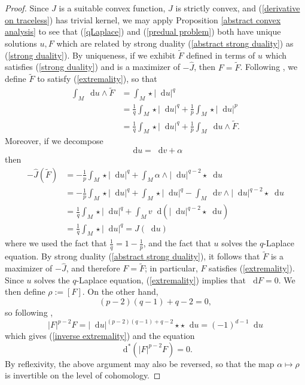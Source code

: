 \documentclass[reqno,11pt]{amsart}
\newcommand*\dif{\mathop{}\!\mathrm{d}}
\theoremstyle{definition}
\numberwithin{equation}{section}
\begin{document}
\begin{proof}
Since $J$ is a suitable convex function, $\hat J$ is strictly convex, and (\ref{derivative on traceless}) has trivial kernel, we may apply Proposition \ref{abstract convex analysis} to see that (\ref{qLaplace}) and (\ref{predual problem}) both have unique solutions $u, F$ which are related by strong duality (\ref{abstract strong duality}) as (\ref{strong duality}).
By uniqueness, if we exhibit $\tilde F$ defined in terms of $u$ which satisfies (\ref{strong duality}) and is a maximizer of $-\hat J$, then $F = \tilde F$.
Following \cite[Chapter IV, (2.12)]{Ekeland99}, we define $\tilde F$ to satisfy (\ref{extremality}), so that 
\begin{align*}
\int_M \dif u \wedge \tilde F 
&= \int_M \star |\dif u|^q \\
&= \frac{1}{q} \int_M \star |\dif u|^q + \frac{1}{p} \int_M \star |\dif u|^p \\
&= \frac{1}{q} \int_M \star |\dif u|^q + \frac{1}{p} \int_M \dif u \wedge \tilde F.
\end{align*}
Moreover, if we decompose 
$$\dif u = \dif v + \alpha$$
then
\begin{align*}
-\hat J(\tilde F)
&= -\frac{1}{p} \int_M \star |\dif u|^q + \int_M \alpha \wedge |\dif u|^{q - 2} \star \dif u \\
&= -\frac{1}{p} \int_M \star |\dif u|^q + \int_M \star |\dif u|^q - \int_M \dif v \wedge |\dif u|^{q - 2} \star \dif u \\
&= \frac{1}{q} \int_M \star |\dif u|^q + \int_M v \dif(|\dif u|^{q - 2} \star \dif u) \\
&= \frac{1}{q} \int_M \star |\dif u|^q = J(\dif u)
\end{align*}
where we used the fact that $\frac{1}{q} = 1 - \frac{1}{p}$, and the fact that $u$ solves the $q$-Laplace equation.
By strong duality (\ref{abstract strong duality}), it follows that $\tilde F$ is a maximizer of $-\hat J$, and therefore $F = \tilde F$; in particular, $F$ satisfies (\ref{extremality}).
Since $u$ solves the $q$-Laplace equation, (\ref{extremality}) implies that $\dif F = 0$.
We then define $\rho := [F]$.
On the other hand, 
$$(p - 2)(q - 1) + q - 2 = 0,$$
so following \cite[Lemma 3.2]{daskalopoulos2020transverse},
$$|F|^{p - 2} F = |\dif u|^{(p - 2)(q - 1) + q - 2} \star \star \dif u = (-1)^{d - 1} \dif u$$
which gives (\ref{inverse extremality}) and the equation
$$\dif^*(|F|^{p - 2} F) = 0.$$
By reflexivity, the above argument may also be reversed, so that the map $\alpha \mapsto \rho$ is invertible on the level of cohomology.
\end{proof}
\end{document}
